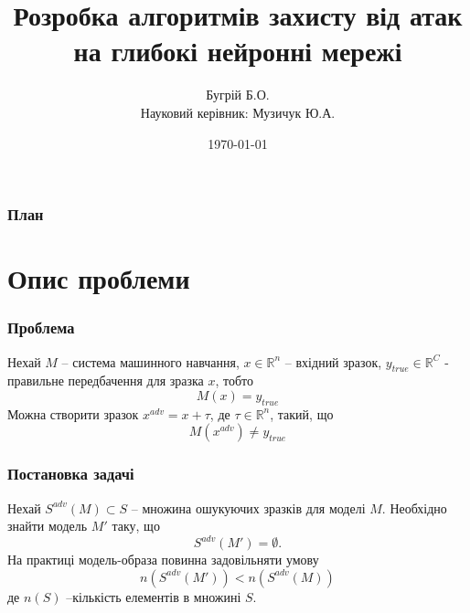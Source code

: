 \documentclass{beamer}
\title[Short title]{Розробка алгоритмів захисту від атак на глибокі нейронні мережі} %
\author[Бугрій Б.О.]{Бугрій Б.О.\\Науковий керівник: Музичук Ю.А.} %
\institute[UCLA] %
{
	Львівський національний університет імені Івана Франка \\
	Факультет прикладної математики та інформатики 
}
\date{\today} %
\numberwithin{equation}{section}
\begin{document}
	
	\begin{frame}
		\titlepage
	\end{frame}
	
	
	\begin{frame}
		\frametitle{План}
		\tableofcontents
	\end{frame}

	\section{Опис проблеми}
	

	\begin{frame}
		\frametitle{Проблема}
		Нехай $M$ -- система машинного навчання, $x\in \mathbb{R}^n$ -- вхідний зразок, $y_{true}\in \mathbb{R}^C$ - правильне передбачення для зразка $x$, тобто 
		\begin{equation}
			M(x) = y_{true}
		\end{equation} 
		Можна створити зразок $x^{adv}=x+\tau$, де $\tau\in \mathbb{R}^n$, такий, що 
		\begin{equation}
			M(x^{adv})\neq y_{true}
		\end{equation}
	\end{frame}

	\begin{frame}
		\frametitle{Постановка задачі}
		Нехай $S^{adv}(M) \subset S$ -- множина ошукуючих зразків для моделі $M$. Необхідно знайти модель $M'$ таку, що
		\begin{equation}
			S^{adv}(M') = \emptyset.
		\end{equation}
		На практиці модель-образа повинна задовільняти умову
		\begin{equation}
			n(S^{adv}(M')) < n(S^{adv}(M))
		\end{equation}
		де $n(S)$ --кількість елементів в множині $S$.
	\end{frame}
\end{document}
